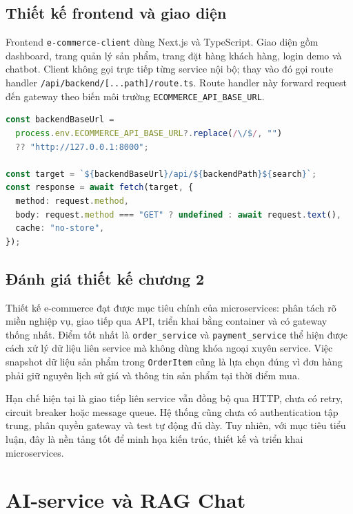 \documentclass[12pt,a4paper]{report}
\begin{document}
\section{Thiết kế frontend và giao diện}
Frontend \texttt{e-commerce-client} dùng Next.js và TypeScript. Giao diện gồm dashboard, trang quản lý sản phẩm, trang đặt hàng khách hàng, login demo và chatbot. Client không gọi trực tiếp từng service nội bộ; thay vào đó gọi route handler \texttt{/api/backend/[...path]/route.ts}. Route handler này forward request đến gateway theo biến môi trường \texttt{ECOMMERCE\_API\_BASE\_URL}.

\begin{lstlisting}[style=code,language=TypeScript,caption={Proxy nội bộ trong Next.js}]
const backendBaseUrl =
  process.env.ECOMMERCE_API_BASE_URL?.replace(/\/$/, "")
  ?? "http://127.0.0.1:8000";

const target = `${backendBaseUrl}/api/${backendPath}${search}`;
const response = await fetch(target, {
  method: request.method,
  body: request.method === "GET" ? undefined : await request.text(),
  cache: "no-store",
});
\end{lstlisting}

\section{Đánh giá thiết kế chương 2}
Thiết kế e-commerce đạt được mục tiêu chính của microservices: phân tách rõ miền nghiệp vụ, giao tiếp qua API, triển khai bằng container và có gateway thống nhất. Điểm tốt nhất là \texttt{order\_service} và \texttt{payment\_service} thể hiện được cách xử lý dữ liệu liên service mà không dùng khóa ngoại xuyên service. Việc snapshot dữ liệu sản phẩm trong \texttt{OrderItem} cũng là lựa chọn đúng vì đơn hàng phải giữ nguyên lịch sử giá và thông tin sản phẩm tại thời điểm mua.

Hạn chế hiện tại là giao tiếp liên service vẫn đồng bộ qua HTTP, chưa có retry, circuit breaker hoặc message queue. Hệ thống cũng chưa có authentication tập trung, phân quyền gateway và test tự động đủ dày. Tuy nhiên, với mục tiêu tiểu luận, đây là nền tảng tốt để minh họa kiến trúc, thiết kế và triển khai microservices.

\chapter{AI-service và RAG Chat}
\end{document}
